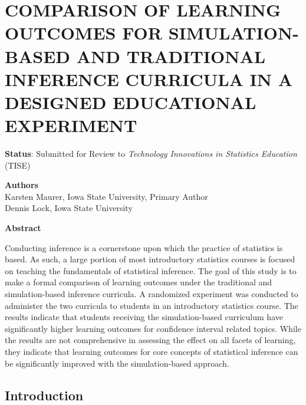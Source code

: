 \documentclass[11pt]{isuthesis}\usepackage[]{graphicx}\usepackage[]{color}
\begin{document}
\chapter{COMPARISON OF LEARNING OUTCOMES FOR SIMULATION-BASED AND TRADITIONAL INFERENCE CURRICULA IN A DESIGNED EDUCATIONAL EXPERIMENT}
\label{CurriculumStudy}
 
 
\begin{center}
\textbf{Status}: Submitted for Review to \textit{Technology Innovations in Statistics Education} (TISE)\\
\end{center} 

\begin{center}
\textbf{Authors}\\
Karsten Maurer, Iowa State University, Primary Author\\
Dennis Lock, Iowa State University
\end{center}


\begin{center}
\textbf{Abstract}\\
\end{center}

Conducting inference is a cornerstone upon which the practice of statistics is based. As such, a large portion of most introductory statistics courses is focused on teaching the fundamentals of statistical inference. The goal of this study is to make a formal comparison of learning outcomes under the traditional and simulation-based inference curricula. A randomized experiment was conducted to administer the two curricula to students in an introductory statistics course.  The results indicate that students receiving the simulation-based curriculum have significantly higher learning outcomes for confidence interval related topics. While the results are not comprehensive in assessing the effect on all facets of learning, they indicate that learning outcomes for core concepts of statistical inference can be significantly improved with the simulation-based approach. 



\section{Introduction}
\label{intro}
\end{document}
